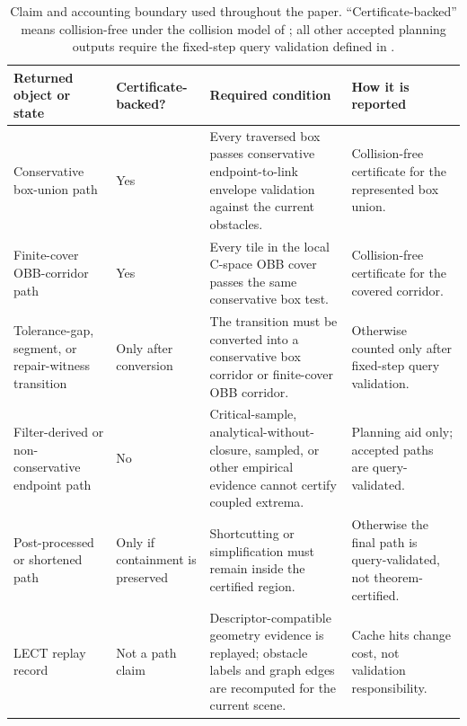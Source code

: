 \documentclass[journal]{IEEEtran}
\newcommand{\cspace}{\mbox{C-space}}
\begin{document}
\begin{table}[!t]
\centering
\caption{Claim and accounting boundary used throughout the paper.
``Certificate-backed'' means collision-free under the collision model of
; all other accepted planning outputs require the
fixed-step query validation defined in .}
\label{tab:claim_boundary}
\fontsize{6.9}{7.35}\selectfont
\setlength{\tabcolsep}{2.0pt}
\renewcommand{\arraystretch}{1.12}
\begin{tabular}{@{}M{0.19\textwidth}M{0.13\textwidth}M{0.35\textwidth}M{0.25\textwidth}@{}}
\toprule
Returned object or state & Certificate-backed? & Required condition & How it is reported \\
\midrule
Conservative box-union path & Yes & Every traversed box passes conservative endpoint-to-link envelope validation against the current obstacles. & Collision-free certificate for the represented box union. \\
Finite-cover OBB-corridor path & Yes & Every tile in the local \cspace{} OBB cover passes the same conservative box test. & Collision-free certificate for the covered corridor. \\
Tolerance-gap, segment, or repair-witness transition & Only after conversion & The transition must be converted into a conservative box corridor or finite-cover OBB corridor. & Otherwise counted only after fixed-step query validation. \\
Filter-derived or non-conservative endpoint path & No & Critical-sample, analytical-without-closure, sampled, or other empirical evidence cannot certify coupled extrema. & Planning aid only; accepted paths are query-validated. \\
Post-processed or shortened path & Only if containment is preserved & Shortcutting or simplification must remain inside the certified region. & Otherwise the final path is query-validated, not theorem-certified. \\
LECT replay record & Not a path claim & Descriptor-compatible geometry evidence is replayed; obstacle labels and graph edges are recomputed for the current scene. & Cache hits change cost, not validation responsibility. \\
\bottomrule
\end{tabular}
\end{table}
\end{document}
